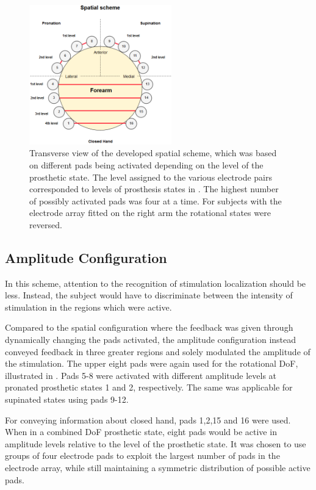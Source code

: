 \begin{figure}[H]                 
	\includegraphics[width=0.55\textwidth]{figures/El_array_spatial}  
	\caption{Transverse view of the developed spatial scheme, which was based on different pads being activated depending on the level of the prosthetic state. The level assigned to the various electrode pairs corresponded to levels of prosthesis states in . The highest number of possibly activated pads was four at a time. For subjects with the electrode array fitted on the right arm the rotational states were reversed.}
	\label{fig:spatial} 
\end{figure}


\subsection{Amplitude Configuration}

In this scheme, attention to the recognition of stimulation localization should be less. Instead, the subject would have to discriminate between the intensity of stimulation in the regions which were active. 

Compared to the spatial configuration where the feedback was given through dynamically changing the pads activated, the amplitude configuration instead conveyed feedback in three greater regions and solely modulated the amplitude of the stimulation. The upper eight pads were again used for the rotational DoF, illustrated in . Pads 5-8 were activated with different amplitude levels at pronated prosthetic states 1 and 2, respectively. The same was applicable for supinated states using pads 9-12. 

For conveying information about closed hand, pads 1,2,15 and 16 were used. When in a combined DoF prosthetic state, eight pads would be active in amplitude levels relative to the level of the prosthetic state. It was chosen to use groups of four electrode pads to exploit the largest number of pads in the electrode array, while still maintaining a symmetric distribution of possible active pads.

